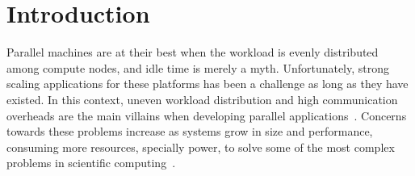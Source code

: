 \section{Introduction}


%
%
%
%
%
%
%
%
%

Parallel machines are at their best when the workload is evenly distributed among compute nodes, and idle time is merely a myth.
Unfortunately, strong scaling applications for these platforms has been a challenge as long as they have existed.
In this context, uneven workload distribution and high communication overheads are the main villains when developing parallel applications~\cite{Deveci2015}.
Concerns towards these problems increase as systems grow in size and performance, consuming more resources, specially power, to solve some of the most complex problems in scientific computing~\cite{exapower2015,padoin2017energy}.

